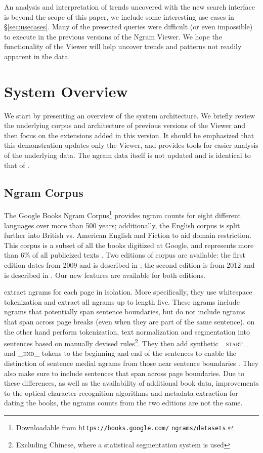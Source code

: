 \documentclass[11pt,a4paper]{article}
\begin{document}
An analysis and interpretation of trends uncovered with the new search interface is beyond the scope of this paper, we include some interesting use cases in \S\ref{sec:usecases}. Many of the presented queries were difficult (or even impossible) to execute in the previous versions of the Ngram Viewer. We hope the functionality of the Viewer will help uncover trends and patterns not readily apparent in the data.


\section{System Overview}
\label{sec:overview}

We start by presenting an overview of the system architecture. We briefly review the underlying corpus and architecture of previous versions of the Viewer \cite{culturomics,lin2012syntactic} and then focus on the extensions added in this version. It should be emphasized that this demonstration updates only the Viewer, and provides tools for easier analysis of the underlying data. The ngram data itself is not updated and is identical to that of .


\subsection{Ngram Corpus}
	The Google Books Ngram Corpus\footnote{Downloadable from \texttt{https://books.google.com/} \texttt{ngrams/datasets}.} provides ngram counts for eight different languages over more than 500 years; additionally, the English corpus is split further into British vs. American English and Fiction to aid domain restriction. This corpus is a subset of all the books digitized at Google, and represents more than 6\% of all publicized texts \cite{lin2012syntactic}. Two editions of corpus are available: the first edition dates from 2009 and is described in ; the second edition is from 2012 and is described in . Our new features are available for both editions.

 extract ngrams for each page in isolation. More specifically, they use whitespace tokenization and extract all ngrams up to length five. These ngrams include ngrams that potentially span sentence boundaries, but do not include ngrams that span across page breaks (even when they are part of the same sentence).
 on the other hand perform tokenization, text normalization and segmentation into sentences based on manually devised rules\footnote{Excluding Chinese, where a statistical segmentation system is used}. They then add synthetic \textsf{\textsc{\_start\_}} and \textsf{\textsc{\_end\_}} tokens to the beginning and end of the sentences to enable the distinction of sentence medial ngrams from those near sentence boundaries \cite{lin2012syntactic}. They also make sure to include sentences that span across page boundaries. Due to these differences, as well as the availability of additional book data, improvements to the optical character recognition algorithms and metadata extraction for dating the books, the ngrams counts from the two editions are not the same.
\end{document}
